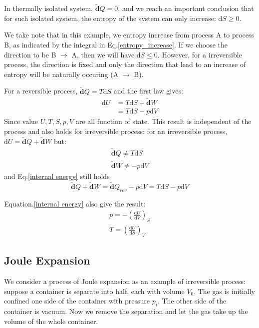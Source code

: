 \documentclass{article}
\newcommand{\dbar}{\mathbf{\tilde{d}}}
\newcommand{\dnor}{\text{d}}
\begin{document}
In thermally isolated system, $\dbar Q = 0$, and we reach an
important conclusion that for such isolated system, the entropy
of the system can only increase: $ \dnor S \ge 0$.

We take note that in this example, we entropy increase from process A to process B, 
as indicated by the integral in Eq.\ref{entropy_increase}. If we choose the direction
to be B $\to$ A, then we will have  $ \dnor S \le 0$. However, for a irreversible process,
the direction is fixed and only the direction that lead to an increase of entropy
will be naturally occuring (A $\to$ B). 

For a reversible process, $\dbar Q = T \dnor S$ and the first law gives:
\begin{align}
    \dnor U & = T \dnor S + \dbar W \\
            & = T \dnor S - p \dnor V \label{internal energy}
\end{align}
Since value $U, T, S, p, V$ are all function of state. This 
result is independent of the process and also holds for 
irreversible process: 
for an irreversible process, $\dnor U = \dbar Q + \dbar W$
but:
\begin{gather}
    \dbar Q \neq  T \dnor S \\
    \dbar W \neq  - p \dnor V 
\end{gather}
and Eq.\ref{internal energy} still holds
\begin{equation}
    \dbar Q + \dbar W = \dbar Q_{rev} - p \dnor V = T \dnor S - p \dnor V
\end{equation}

Equation.\ref{internal energy} also give the result:
\begin{gather}
    p = - \left(\frac{\dnor U}{\dnor V}\right)_S \\
    T = \left(\frac{\dnor U}{\dnor S}\right)_V
\end{gather}

\subsection{Joule Expansion}
We consider a process of Joule expansion as an example of irreversible process:
suppose a container is separate into half, each with volume $V_0$. The gas is 
initially confined one side of the container with pressure $p_i$. The other side
of the container is vacuum. Now we remove the separation and let the 
gas take up the volume of the whole container.
\end{document}
